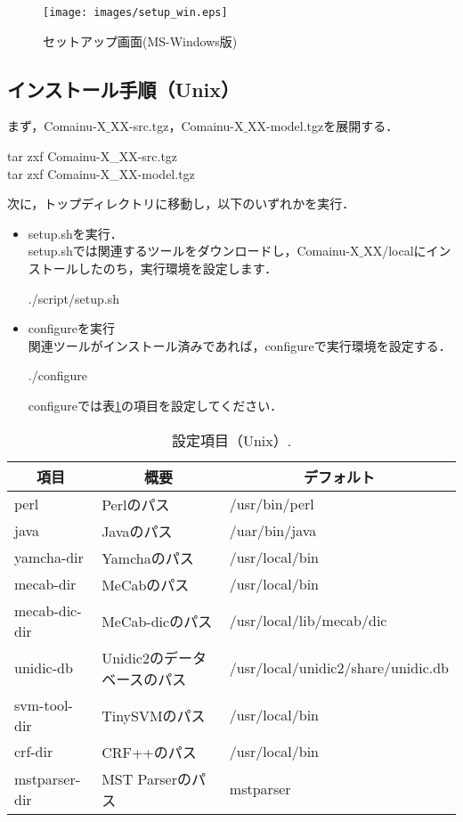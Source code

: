 \documentclass[titlepage]{jarticle}
\begin{document}
\begin{figure}[!ht]
\begin{center}
\texttt{[image: images/setup\_win.eps]}
\caption{セットアップ画面(MS-Windows版)}
\label{method_flow}
\end{center}
\end{figure}

\subsection{インストール手順（Unix）}
まず，Comainu-X$\_$XX-src.tgz，Comainu-X$\_$XX-model.tgzを展開する．
\begin{screen}
tar zxf Comainu-X\_XX-src.tgz \\
tar zxf Comainu-X\_XX-model.tgz
\end{screen}
次に，トップディレクトリに移動し，以下のいずれかを実行．
\begin{itemize}
\item setup.shを実行．\\
setup.shでは関連するツールをダウンロードし，Comainu-X$\_$XX/localにインストールしたのち，実行環境を設定します．
\begin{screen}
./script/setup.sh
\end{screen}
\item configureを実行\\
関連ツールがインストール済みであれば，configureで実行環境を設定する．
\begin{screen}
./configure
\end{screen}
configureでは表\ref{setup_unix}の項目を設定してください．
\end{itemize}

\begin{table}[!ht]
\small
\begin{center}
\caption{設定項目（Unix）.}
\begin{tabular}{|l|l|l|}
\hline
\multicolumn{1}{|c|}{項目} & \multicolumn{1}{c}{概要} & \multicolumn{1}{|c|}{デフォルト} \\ \hline
perl & Perlのパス & /usr/bin/perl \\ \hline
java & Javaのパス & /uar/bin/java \\ \hline
yamcha-dir & Yamchaのパス & /usr/local/bin \\ \hline
mecab-dir & MeCabのパス & /usr/local/bin \\ \hline
mecab-dic-dir & MeCab-dicのパス & /usr/local/lib/mecab/dic \\ \hline
unidic-db & Unidic2のデータベースのパス & /usr/local/unidic2/share/unidic.db \\ \hline
svm-tool-dir & TinySVMのパス & /usr/local/bin \\ \hline
crf-dir & CRF++のパス & /usr/local/bin \\ \hline
mstparser-dir & MST Parserのパス & mstparser \\ \hline
\end{tabular}
\label{setup_unix}
\end{center}
\end{table}
\end{document}
